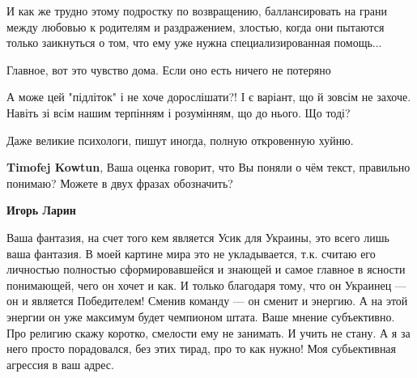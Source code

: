 \begin{itemize}
И как же трудно этому подростку по возвращению, баллансировать на грани между
любовью к родителям и раздражением, злостью, когда они пытаются только
заикнуться о том, что ему уже нужна специализированная помощь...

\begin{itemize} %
Главное, вот это чувство дома. Если оно есть ничего не потеряно
\end{itemize} %

А може цей "підліток" і не хоче дорослішати?! І є варіант, що й зовсім не захоче. Навіть зі всім нашим терпінням і розумінням, що до нього. Що тоді?

Даже великие психологи, пишут иногда, полную откровенную хуйню.

\begin{itemize} %
\textbf{Timofej Kowtun}, Ваша оценка говорит, что Вы поняли о чём текст, правильно понимаю?
Можете в двух фразах обозначить?

\textbf{Игорь Ларин} 

Ваша фантазия, на счет того кем является Усик для Украины, это всего лишь ваша
фантазия. В моей картине мира это не укладывается, т.к. считаю его личностью
полностью сформировавшейся и знающей и самое главное в ясности понимающей, чего
он хочет и как. И только благодаря тому, что он Украинец — он и является
Победителем! Сменив команду — он сменит и энергию. А на этой энергии он уже
максимум будет чемпионом штата. Ваше мнение субъективно. Про религию скажу
коротко, смелости ему не занимать. И учить не стану. А я за него просто
порадовался, без этих тирад, про то как нужно! Моя субьективная агрессия в ваш
адрес.

\end{itemize} %

\end{itemize} %

